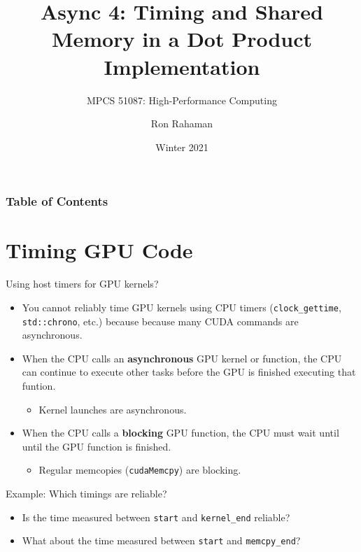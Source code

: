 \documentclass{beamer}
\title{Async 4: Timing and Shared Memory in a Dot Product Implementation}
\subtitle{MPCS 51087: High-Performance Computing}
\date{Winter 2021}
\author{Ron Rahaman}
\institute{The University of Chicago, Dept of Computer Science}
\begin{document}
    \maketitle

    \begin{frame}
        \frametitle{Table of Contents}
        \tableofcontents[]
    \end{frame}

    \section{Timing GPU Code}

    \begin{frame}{Using host timers for GPU kernels?}
        \begin{itemize}
            \item You cannot reliably time GPU kernels using CPU timers (\texttt{clock\_gettime}, \texttt{std::chrono}, etc.) because because many CUDA commands are asynchronous.
            \item When the CPU calls an \textbf{asynchronous} GPU kernel or function, the CPU can continue to execute other tasks before the GPU is finished executing that funtion.
            \begin{itemize}
                \item Kernel launches are asynchronous.
            \end{itemize}
            \item When the CPU calls a \textbf{blocking} GPU function, the CPU must wait until until the GPU function is finished.
            \begin{itemize}
                \item Regular memcopies (\texttt{cudaMemcpy}) are blocking.
            \end{itemize}
        \end{itemize}
    \end{frame}

    \begin{frame}{Example: Which timings are reliable?}
        \begin{itemize}
            \item Is the time measured between \texttt{start} and \texttt{kernel\_end} reliable?
            \item What about the time measured between \texttt{start} and \texttt{memcpy\_end}?
        \end{itemize}
        \begin{block}{}
            \inputminted{cuda}{src/cpu-timer.cu}
        \end{block}
    \end{frame}
\end{document}
